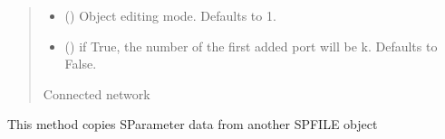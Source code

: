 \documentclass[letterpaper,10pt,english]{sphinxmanual}
\begin{document}
\begin{fulllineitems}
\begin{fulllineitems}
\begin{quote}
\begin{description}
\begin{itemize}
\item {}
\sphinxAtStartPar
{} (\sphinxstyleliteralemphasis{\sphinxupquote{, }}) \textendash{} Object editing mode. Defaults to \sphinxhyphen{}1.

\item {}
\sphinxAtStartPar
{} (\sphinxstyleliteralemphasis{\sphinxupquote{, }}) \textendash{} if True, the number of the first added port will be k. Defaults to False.

\end{itemize}

\sphinxAtStartPar
Connected network

\sphinxAtStartPar
{\hyperref[\detokenize{touchstone:touchstone.spfile}]{}}

\end{description}\end{quote}

\end{fulllineitems}


\begin{fulllineitems}
\label{\detokenize{touchstone:touchstone.spfile.convert_s1p_to_s2p}}
\pysigstartsignatures
{}
\pysigstopsignatures
\end{fulllineitems}


\begin{fulllineitems}
\label{\detokenize{touchstone:touchstone.spfile.copy}}
\pysigstartsignatures
{}
\pysigstopsignatures
\end{fulllineitems}


\begin{fulllineitems}
\label{\detokenize{touchstone:touchstone.spfile.copy_data_from_spfile}}
\pysigstartsignatures
{}
\pysigstopsignatures
\sphinxAtStartPar
This method copies S\sphinxhyphen{}Parameter data from another SPFILE object


\end{fulllineitems}
\end{fulllineitems}
\end{document}
